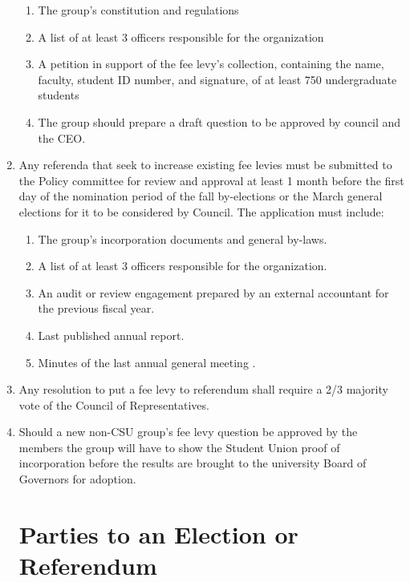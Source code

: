 \documentclass[oneside]{book}
\begin{document}
\begin{enumerate}
\begin{enumerate}
\item The group's constitution and regulations
\item A list of at least 3 officers responsible for the organization 
\item A petition in support of the fee levy's collection, containing the
name, faculty, student ID number, and signature, of at least 750 undergraduate
students 
\item The group should prepare a draft question to be approved by council
and the CEO. 
\end{enumerate}
\item Any referenda that seek to increase existing fee levies must be submitted
to the Policy committee for review and approval at least 1 month before
the first day of the nomination period of the fall by-elections or
the March general elections for it to be considered by Council. The
application must include: 
\begin{enumerate}
\item The group's incorporation documents and general by-laws. 
\item A list of at least 3 officers responsible for the organization. 
\item An audit or review engagement prepared by an external accountant for
the previous fiscal year. 
\item Last published annual report. 
\item Minutes of the last annual general meeting . 
\end{enumerate}
\item Any resolution to put a fee levy to referendum shall require a 2/3
majority vote of the Council of Representatives. 
\item Should a new non-CSU group's fee levy question be approved by the
members the group will have to show the Student Union proof of incorporation
before the results are brought to the university Board of Governors
for adoption. 

\chapter{\label{Parties_to_an_Election_or_Referendum}Parties to an Election
or Referendum }



\end{enumerate}
\end{document}
